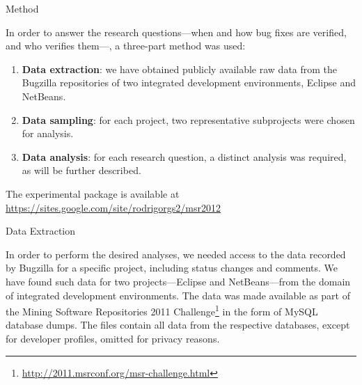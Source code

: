 \begin{section}{Method} \label{sec:methods}


	In order to answer the research questions---when and how bug fixes are verified, and who verifies them---, a three-part method was used:
	
	\begin{enumerate}
		\item \textbf{Data extraction}: we have obtained publicly available raw data from the Bugzilla repositories of two integrated development environments, Eclipse and NetBeans.

		\item \textbf{Data sampling}: for each project, two representative subprojects were chosen for analysis.
		
		
		
		\item \textbf{Data analysis}: for each research question, a distinct analysis was required, as will be further described.
	\end{enumerate}	
	
	The experimental package is available at \\ \url{https://sites.google.com/site/rodrigorgs2/msr2012}

\begin{subsection}{Data Extraction}
	
	In order to perform the desired analyses, we needed access to the data recorded by Bugzilla for a specific project, including status changes and comments. We have found such data for two projects---Eclipse and NetBeans---from the domain of integrated development environments. The data was made available as part of the Mining Software Repositories 2011 Challenge\footnote{\url{http://2011.msrconf.org/msr-challenge.html}} in the form of MySQL database dumps. The files contain all data from the respective databases, except for developer profiles, omitted for privacy reasons.
	

\end{subsection}
\end{section}
